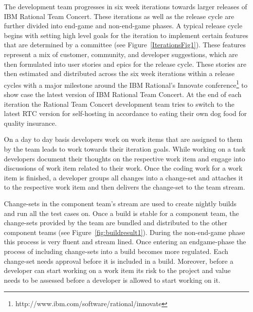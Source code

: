 The development team progresses in six week iterations towards larger releases of IBM Rational Team Concert.
These iterations as well as the release cycle are further divided into end-game and non-end-game phases.
A typical release cycle begins with setting high level goals for the iteration to implement certain features that are determined by a committee (see Figure~\ref{IterationsFig1}).
These features represent a mix of customer, community, and developer suggestions, which are then formulated into user stories and epics for the release cycle.
These stories are then estimated and distributed across the six week iterations within a release cycles with a major milestone around the IBM Rational's Innovate conference\footnote{http://www.ibm.com/software/rational/innovate} to show case the latest version of IBM Rational Team Concert. 
At the end of each iteration the Rational Team Concert development team tries to switch to the latest RTC version for self-hosting in accordance to eating their own dog food for quality insurance.

On a day to day basis developers work on work items that are assigned to them by the team leads to work towards their iteration goals.
While working on a task developers document their thoughts on the respective work item and engage into discussions of work item related to their work.
Once the coding work for a work item is finished, a developer groups all changes into a change-set and attaches it to the respective work item and then delivers the change-set to the team stream.

Change-sets in the component team's stream are used to create nightly builds and run all the test cases on.
Once a build is stable for a component team, the change-sets provided by the team are bundled and distributed to the other component teams (see Figure~\ref{fig:buildresult1}).
During the non-end-game phase this process is very fluent and stream lined.
Once entering an endgame-phase the process of including change-sets into a build becomes more regulated.
Each change-set needs approval before it is included in a build.
Moreover, before a developer can start working on a work item its risk to the project and value needs to be assessed before a developer is allowed to start working on it.
